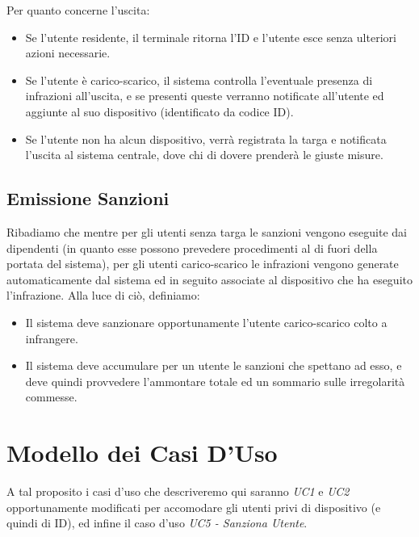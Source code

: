 \documentclass[12pt, letterpaper]{article}
\begin{document}
\noindent
Per quanto concerne l'uscita:
\begin{itemize}
    \item Se l'utente residente, il terminale ritorna l'ID e 
    l'utente esce senza ulteriori azioni necessarie.
    \item Se l'utente è carico-scarico, il sistema controlla
    l'eventuale presenza di infrazioni all'uscita, e se 
    presenti queste verranno notificate all'utente ed 
    aggiunte al suo dispositivo (identificato da codice ID).
    \item Se l'utente non ha alcun dispositivo, verrà registrata
    la targa e notificata l'uscita al sistema centrale, 
    dove chi di dovere prenderà le giuste misure. 
\end{itemize}

\subsection{Emissione Sanzioni}
Ribadiamo che mentre per gli utenti senza targa le sanzioni 
vengono eseguite dai dipendenti (in quanto esse possono 
prevedere procedimenti al di fuori della portata del sistema),
per gli utenti carico-scarico le infrazioni vengono generate 
automaticamente dal sistema ed in seguito associate al dispositivo
che ha eseguito l'infrazione. Alla luce di ciò, definiamo:
\begin{itemize}
    \item Il sistema deve sanzionare opportunamente l'utente 
    carico-scarico colto a infrangere. 
    \item Il sistema deve accumulare per un utente le sanzioni 
    che spettano ad esso, e deve quindi provvedere l'ammontare 
    totale ed un sommario sulle irregolarità commesse.
\end{itemize}

\section{Modello dei Casi D'Uso}
A tal proposito i casi d'uso che descriveremo qui saranno
\emph{UC1} e \emph{UC2} opportunamente modificati per 
accomodare gli utenti privi di dispositivo 
(e quindi di ID), ed infine il caso d'uso 
\emph{UC5 - Sanziona Utente}.
\end{document}
